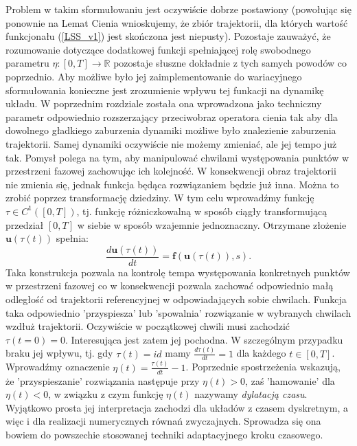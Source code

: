 \documentclass[12pt, twoside]{book}
\begin{document}
Problem w takim sformułowaniu jest oczywiście dobrze postawiony (powołując się ponownie na Lemat Cienia wnioskujemy, że zbiór trajektorii, dla których wartość funkcjonału (\ref{LSS_v1}) jest skończona jest niepusty). Pozostaje zauważyć, że rozumowanie dotyczące dodatkowej funkcji spełniającej rolę swobodnego parametru $ \eta: [0,T] \rightarrow \mathbb{R} $ pozostaje słuszne dokładnie z tych samych powodów co poprzednio. Aby możliwe było jej zaimplementowanie do wariacyjnego sformułowania konieczne jest zrozumienie wpływu tej funkacji na dynamikę układu. W poprzednim rozdziale została ona wprowadzona jako techniczny parametr odpowiednio rozszerzający przeciwobraz operatora cienia tak aby dla dowolnego gładkiego zaburzenia dynamiki możliwe było znalezienie zaburzenia trajektorii. Samej dynamiki oczywiście nie możemy zmieniać, ale jej tempo już tak. Pomysł polega na tym, aby manipulować chwilami występowania punktów w przestrzeni fazowej zachowując ich kolejność. W konsekwencji obraz trajektorii nie zmienia się, jednak funkcja będąca rozwiązaniem będzie już inna. Można to zrobić poprzez transformację dziedziny. W tym celu wprowadźmy funkcję $ \tau \in C^{1}([0,T]) $, tj. funkcję różniczkowalną w sposób ciągły transformującą przedział $ [0,T] $ w siebie w sposób wzajemnie jednoznaczny. Otrzymane złożenie $ \textbf{u}(\tau(t)) $ spełnia:
\begin{equation}
\frac{d\textbf{u}(\tau (t))}{dt} = \textbf{f}(\textbf{u}(\tau(t)), s).
\label{LSS_v2}
\end{equation}  
Taka konstrukcja pozwala na kontrolę tempa występowania konkretnych punktów w przestrzeni fazowej co w konsekwencji pozwala zachować odpowiednio małą odległość od trajektorii referencyjnej w odpowiadających sobie chwilach. \newline
Funkcja taka odpowiednio 'przyspiesza' lub 'spowalnia' rozwiązanie w wybranych chwilach wzdłuż trajektorii. Oczywiście w początkowej chwili musi zachodzić $ \tau(t=0) = 0 $. Interesująca jest zatem jej pochodna. W szczególnym przypadku braku jej wpływu, tj. gdy $ \tau(t) = id $ mamy $ \frac{d\tau(t)}{dt} = 1$ dla każdego $ t \in [0,T] $. Wprowadźmy oznaczenie $ \eta(t) = \frac{\tau(t)}{dt}-1 $. Poprzednie spostrzeżenia wskazują, że 'przyspieszanie' rozwiązania następuje przy $ \eta(t) > 0$, zaś 'hamowanie' dla  $ \eta(t) < 0$, w związku z czym funkcję $ \eta(t) $ nazywamy \textit{dylatacją czasu}.\newline
Wyjątkowo prosta jej interpretacja zachodzi dla układów z czasem dyskretnym, a więc i dla realizacji numerycznych równań zwyczajnych. Sprowadza się ona bowiem do powszechie stosowanej techniki adaptacyjnego kroku czasowego.
\end{document}

